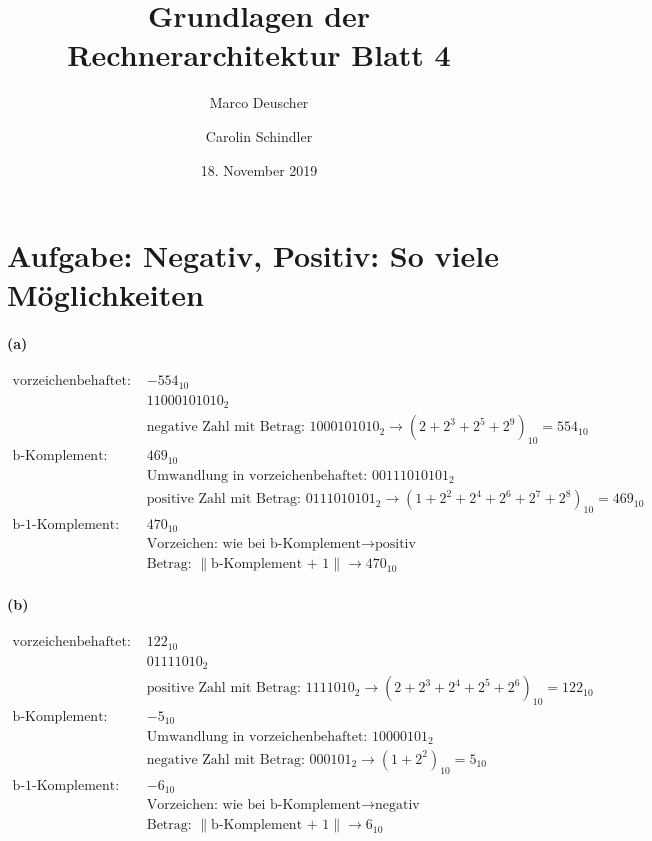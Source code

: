 \documentclass[a4paper]{article}
\title{Grundlagen der Rechnerarchitektur Blatt 4}
\author{Marco Deuscher \and Carolin Schindler}
\date{18. November 2019}
\begin{document}
\maketitle
\section{Aufgabe: Negativ, Positiv: So viele Möglichkeiten}
\paragraph{(a)}
\begin{align*}
\text{vorzeichenbehaftet: } &-554_{10} \\
	&11000101010_{2} \\
	&\text{negative Zahl mit Betrag: } 1000101010_{2}\rightarrow (2 + 2^3 + 2^5 + 2^9)_{10} = 554_{10} \\
\text{b-Komplement: } &469_{10} \\
	&\text{Umwandlung in vorzeichenbehaftet: } 00111010101_{2} \\
	&\text{positive Zahl mit Betrag: } 0111010101_{2}\rightarrow (1 + 2^2 + 2^4 + 2^6 + 2^7 + 2^8)_{10} = 469_{10} \\
\text{b-1-Komplement: } &470_{10} \\
	&\text{Vorzeichen: wie bei b-Komplement} \rightarrow \text{positiv} \\
	&\text{Betrag: $\|$b-Komplement + 1$\|$} \rightarrow 470_{10}
\end{align*}

\paragraph{(b)}
\begin{align*}
\text{vorzeichenbehaftet: } &122_{10} \\
	&01111010_{2} \\
	&\text{positive Zahl mit Betrag: } 1111010_{2}\rightarrow (2 + 2^3 + 2^4 + 2^5 + 2^6)_{10} = 122_{10} \\
\text{b-Komplement: } &-5_{10} \\
	&\text{Umwandlung in vorzeichenbehaftet: } 10000101_{2} \\
	&\text{negative Zahl mit Betrag: } 000101_{2}\rightarrow (1 + 2^2)_{10} = 5_{10} \\
\text{b-1-Komplement: } &-6_{10} \\
	&\text{Vorzeichen: wie bei b-Komplement} \rightarrow \text{negativ} \\
	&\text{Betrag: $\|$b-Komplement + 1$\|$} \rightarrow 6_{10}
\end{align*}
\end{document}
